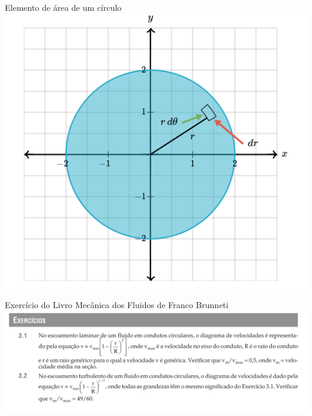 \documentclass[t,%
brazilian,%
11pt,%
aspectratio=169,%
table%
]{beamer}
\begin{document}
\begin{frame}{Elemento de área de um círculo}
    \centering
    \includegraphics[height=\textheight-28pt]{images/Captura de tela de 2025-04-23 17-19-53.png}
\end{frame}

\begin{frame}{Exercício do Livro Mecânica dos Fluidos de Franco Brunneti}
    \centering
    \includegraphics[width=\textwidth]{images/Captura de tela de 2025-04-23 17-58-33.png}
\end{frame}
\end{document}
